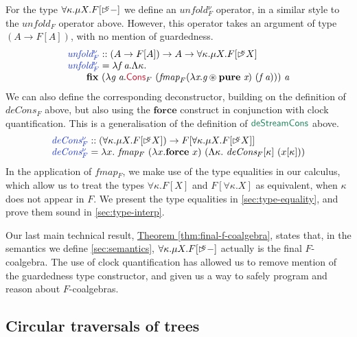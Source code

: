 \documentclass[natbib]{sigplanconf}
\newcommand{\cons}[1]{\textcolor{cons}{\textsf{#1}}}
\newcommand{\elim}[1]{\textcolor{elim}{\textsf{#1}}}
\newcommand{\kw}[1]{\textbf{#1}}
\newcommand{\ident}[1]{\textit{#1}}
\newcommand{\defn}[1]{\textcolor{defnd}{\ident{#1}}}
\newcommand{\delay}[1]{\mathord{\rhd\kern-0.4em^{#1}}}
\newcommand{\thmref}[1]{\hyperref[#1]{Theorem \ref*{#1}}}
\begin{document}
For the type $\forall \kappa. \mu X. F[\delay\kappa-]$ we define an
$\ident{unfold$^\nu_F$}$ operator, in a similar style to the
$\ident{unfold$_F$}$ operator above. However, this operator takes an
argument of type $(A \to F[A])$, with no mention of guardedness.
\begin{displaymath}
  \begin{array}{l}
    \defn{unfold$^\nu_F$} :: (A \to F[A]) \to A \to \forall \kappa. \mu X. F[\delay\kappa X] \\
    \defn{unfold$^\nu_F$} = \lambda \ident{f}\ \ident{a}. \Lambda \kappa. \\
    \quad\quad\kw{fix}\ (\lambda \ident{g}\ \ident{a}. \cons{Cons}_F\ (\ident{fmap}_F (\lambda \ident{x}. \ident{g} \circledast \kw{pure}\ \ident{x})\ (\ident{f}\ \ident{a})))\ \ident{a}
  \end{array}
\end{displaymath}
We can also define the corresponding deconstructor, building on the
definition of $\ident{deCons$_F$}$ above, but also using the $\kw{force}$
construct in conjunction with clock quantification. This is a
generalisation of the definition of $\elim{deStreamCons}$ above.
\begin{displaymath}
  \begin{array}{l}
    \defn{deCons$^\nu_F$} :: (\forall \kappa. \mu X. F[\delay\kappa X]) \to F[\forall \kappa. \mu X. F[\delay\kappa X]] \\
    \defn{deCons$^\nu_F$} = \lambda x.~\ident{fmap$_F$}\ (\lambda x. \kw{force}\ x)\ (\Lambda \kappa.~\ident{deCons$_F$}[\kappa]\ (x[\kappa]))
  \end{array}
\end{displaymath}
In the application of $\ident{fmap$_F$}$, we make use of the type
equalities in our calculus, which allow us to treat the types $\forall
\kappa. F[X]$ and $F[\forall \kappa. X]$ as equivalent, when $\kappa$
does not appear in $F$. We present the type equalities in
\autoref{sec:type-equality}, and prove them sound in
\autoref{sec:type-interp}.

Our last main technical result, \thmref{thm:final-f-coalgebra}, states
that, in the semantics we define \autoref{sec:semantics}, $\forall
\kappa. \mu X. F[\delay\kappa-]$ actually is the final
$F$-coalgebra. The use of clock quantification has allowed us to
remove mention of the guardedness type constructor, and given us a way
to safely program and reason about $F$-coalgebras.

\subsection{Circular traversals of trees}
\label{sec:repmin}
\end{document}
